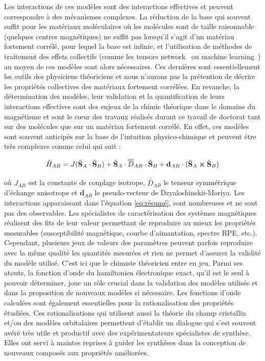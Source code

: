 \documentclass[12pt,a4paper]{report}
\numberwithin{equation}{section}
\begin{document}
Les interactions de ces modèles sont des interactions effectives et peuvent correspondre à des mécanismes complexes. 
La réduction de la base qui souvent suffit pour les matériaux moléculaires où les molécules sont de taille raisonnable (quelques centres magnétiques) ne suffit pas lorsqu’il s’agit d’un matériau fortement corrélé, pour lequel la base est infinie, et l’utilisation de méthodes de traitement des effets collectifs (comme les tensors network~\cite{he_signatures_2017,liao_gapless_2017} ou machine learning~\cite{duric_spin-12_2025}) au moyen de ces modèles sont alors nécessaires. 
Ces dernières sont essentiellement les outils des physiciens théoriciens et nous n’aurons pas la prétention de décrire les propriétés collectives des matériaux fortement corrélées. 
En revanche, la détermination des modèles, leur validation et la quantification de leurs interactions effectives sont des enjeux de la chimie théorique dans le domaine du magnétisme et sont le c\oe ur des travaux réalisés durant ce travail de doctorat tant sur des molécules que sur un matériau fortement corrélé. 
En effet, ces modèles sont souvent anticipés sur la base de l’intuition physico-chimique et peuvent être très complexes comme celui qui suit :  

\begin{equation}\label{eq:résumé}
  \hat{H}_{AB}=J(\hat{\mathbf{S}}_A \cdot \hat{\mathbf{S}}_B) + \hat{\mathbf{S}}_A \cdot\overline{\overline{D}}_{AB} \cdot \hat{\mathbf{S}}_B + \mathbf{{d}}_{AB} \cdot (\hat{\mathbf{S}}_A \cross \hat{\mathbf{S}}_B)
\end{equation}

où $J_{AB}$ est la constante de couplage isotrope, $\overline{\overline{D}}_{AB}$ le tenseur symmétrique d'échange anisotrope et $\mathbf{{d}}_{AB}$ le pseudo-vecteur de Dzyaloshinskii-Moriya.
Les interactions apparaissant dans l’équation \ref{eq:résumé}, sont nombreuses et ne sont pas des observables. 
Les spécialistes de caractérisation des systèmes magnétiques réalisent des fits de leur valeur permettant de reproduire au mieux les propriétés mesurables (susceptibilité magnétique, courbe d’aimantation, spectre RPE, etc.).
Cependant, plusieurs jeux de valeurs des paramètres peuvent parfois reproduire avec la même qualité les quantités mesurées et rien ne permet d’assurer la validité du modèle utilisé.
C’est ici que le chimiste théoricien entre en jeu.
Parmi ses atouts, la fonction d’onde du hamiltonien électronique exact, qu’il est le seul à pouvoir déterminer, joue un rôle crucial dans la validation des modèles utilisés et dans la proposition de nouveaux modèles si nécessaire.
Les fonctions d’onde calculées sont également essentielles pour la rationalisation des propriétés étudiées.
Ces rationalisations qui utilisent aussi la théorie du champ cristallin et/ou des modèles orbitalaires permettent d’établir un dialogue qui s’est souvent avéré très utile et productif avec des expérimentateurs spécialistes de synthèse.
Elles ont servi à maintes reprises à guider les synthèses dans la conception de nouveaux composés aux propriétés améliorées.
\end{document}
